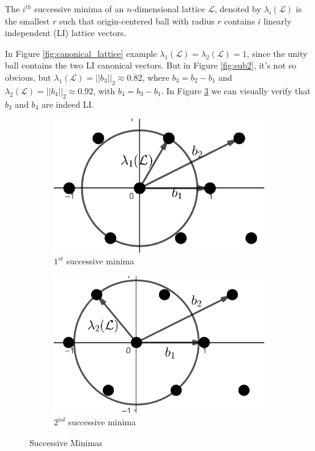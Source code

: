 \begin{definition}
The $i^{th}$ successive minima of an $n$-dimensional lattice $\mathcal L$, denoted by $\lambda_i(\mathcal L)$ is the smallest $r$ such that origin-centered ball with radius $r$ contains $i$ linearly independent (LI) lattice vectors.
\end{definition}

In Figure \ref{fig:canonical_lattice} example $\lambda_1(\mathcal L)=\lambda_2(\mathcal L)=1$, since the unity ball contains the two LI canonical vectors. But in Figure \ref{fig:sub2}, it's not so obvious, but $\lambda_1(\mathcal L)=||b_3||_2\approx 0.82$, where $b_3=b_2-b_1$ and $\lambda_2(\mathcal L) = ||b_4||_2\approx0.92$, with $b_4=b_3-b_1$. In Figure \ref{fig:successive_minimas} we can visually verify that $b_3$ and $b_4$ are indeed LI.

\begin{figure}[!htb]
\centering
\begin{subfigure}{.5\textwidth}
  \centering
  \includegraphics[scale=0.25]{files/figures/lambda1.png}
  \caption{$1^{st}$ successive minima}
  \label{fig:lambda1}
\end{subfigure}%
\begin{subfigure}{.5\textwidth}
  \centering
  \includegraphics[scale=0.23]{files/figures/lambda2.png}
  \caption{$2^{nd}$ successive minima}
  \label{fig:lambda2}
\end{subfigure}
\caption{Successive Minimas}
\label{fig:successive_minimas}
\end{figure}

